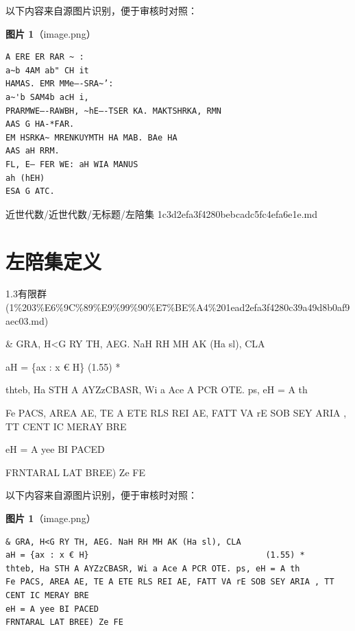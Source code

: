 \begin{note}
以下内容来自源图片识别，便于审核时对照：

\textbf{图片 1}（image.png）
\begin{Verbatim}[fontsize=\small]
A ERE ER RAR ~ :
a~b 4AM ab" CH it
HAMAS. EMR MMe—-SRA~’:
a~'b SAM4b acH i,
PRARMWE—-RAWBH, ~hE—-TSER KA. MAKTSHRKA, RMN
AAS G HA-*FAR.
EM HSRKA~ MRENKUYMTH HA MAB. BAe HA
AAS aH RRM.
FL, E— FER WE: aH WIA MANUS
ah (hEH)
ESA G ATC.
\end{Verbatim}

\end{note}

\begin{note}[来源路径]

近世代数/近世代数/无标题/左陪集 1c3d2efa3f4280bebcadc5fc4efa6e1e.md

\end{note}

\section*{左陪集定义}

\begin{note}[来源上级主题]

1.3有限群 (1\%203\%E6\%9C\%89\%E9\%99\%90\%E7\%BE\%A4\%201ead2efa3f4280c39a49d8b0af9aec03.md)

\end{note}

\begin{definition}[左陪集定义]

\& GRA, H<G RY TH, AEG. NaH RH MH AK (Ha sl), CLA

aH = \{ax : x € H\}                                    (1.55) *

thteb, Ha STH A AYZzCBASR, Wi a Ace A PCR OTE. ps, eH = A th

Fe PACS, AREA AE, TE A ETE RLS REI AE, FATT VA rE SOB SEY ARIA , TT CENT IC MERAY BRE

eH = A yee BI PACED

FRNTARAL LAT BREE) Ze FE

\end{definition}

\begin{note}
以下内容来自源图片识别，便于审核时对照：

\textbf{图片 1}（image.png）
\begin{Verbatim}[fontsize=\small]
& GRA, H<G RY TH, AEG. NaH RH MH AK (Ha sl), CLA
aH = {ax : x € H}                                    (1.55) *
thteb, Ha STH A AYZzCBASR, Wi a Ace A PCR OTE. ps, eH = A th
Fe PACS, AREA AE, TE A ETE RLS REI AE, FATT VA rE SOB SEY ARIA , TT CENT IC MERAY BRE
eH = A yee BI PACED
FRNTARAL LAT BREE) Ze FE
\end{Verbatim}

\end{note}

